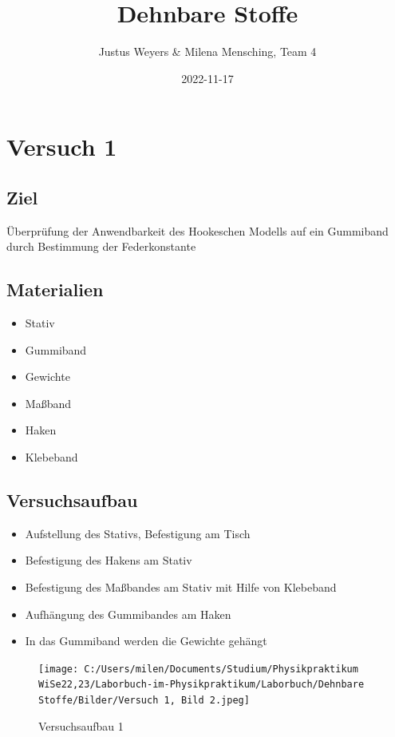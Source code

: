 \documentclass[
]{article}
\title{Dehnbare Stoffe}
\author{Justus Weyers \& Milena Mensching, Team 4}
\date{2022-11-17}
\providecommand{\tightlist}{%
  \setlength{\itemsep}{0pt}\setlength{\parskip}{0pt}}
\begin{document}
\maketitle

\hypertarget{versuch-1}{%
\section{Versuch 1}\label{versuch-1}}

\hypertarget{ziel}{%
\subsection{Ziel}\label{ziel}}

Überprüfung der Anwendbarkeit des Hookeschen Modells auf ein Gummiband
durch Bestimmung der Federkonstante

\hypertarget{materialien}{%
\subsection{Materialien}\label{materialien}}

\begin{itemize}
\tightlist
\item
  Stativ
\item
  Gummiband
\item
  Gewichte
\item
  Maßband
\item
  Haken
\item
  Klebeband
\end{itemize}

\hypertarget{versuchsaufbau}{%
\subsection{Versuchsaufbau}\label{versuchsaufbau}}

\begin{itemize}
\tightlist
\item
  Aufstellung des Stativs, Befestigung am Tisch
\item
  Befestigung des Hakens am Stativ
\item
  Befestigung des Maßbandes am Stativ mit Hilfe von Klebeband
\item
  Aufhängung des Gummibandes am Haken
\item
  In das Gummiband werden die Gewichte gehängt
\end{itemize}

\begin{figure}
\centering
\texttt{[image: C:/Users/milen/Documents/Studium/Physikpraktikum WiSe22,23/Laborbuch-im-Physikpraktikum/Laborbuch/Dehnbare Stoffe/Bilder/Versuch 1, Bild 2.jpeg]}
\caption{Versuchsaufbau 1}
\end{figure}
\end{document}
